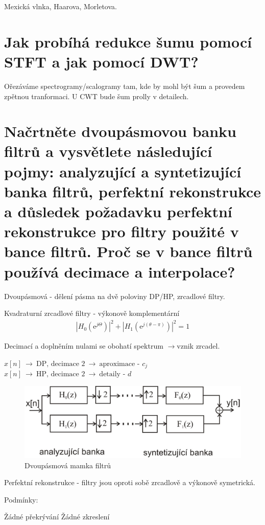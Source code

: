 \documentclass[a4paper,12pt]{article}   %
\newcommand{\rrarr}{$\rightarrow$}
\newcommand{\ejt}{\text{e}^{j\Theta}}
\newcommand{\e}{\text{e}}
\begin{document}
Mexická vlnka, Haarova, Morletova.


\section{Jak probíhá redukce šumu pomocí STFT a jak pomocí DWT?}

Ořezáváme spectrogramy/scalogramy tam, kde by mohl být šum a provedem zpětnou tranformaci. U CWT bude šum prolly v detailech. 


\section{Načrtněte dvoupásmovou banku filtrů a vysvětlete následující pojmy: analyzující a syntetizující banka filtrů, perfektní rekonstrukce a důsledek požadavku perfektní rekonstrukce pro filtry použité v bance filtrů. Proč se v bance filtrů používá decimace a interpolace?}
Dvoupásmová - dělení pásma na dvě poloviny DP/HP, zrcadlové filtry. 

Kvadraturní zrcadlové filtry - výkonově komplementární \
\begin{align*}
        |H_0(\ejt)|^2 + |H_1(\e^{j(\theta-\pi)})|^2 = 1
\end{align*}

Decimací a doplněním nulami se obohatí spektrum \rrarr vznik zrcadel.


$x[n]~\rightarrow~\text{DP, decimace 2}~\rightarrow~\text{aproximace - }c_j$\\
$x[n]~\rightarrow~\text{HP, decimace 2}~\rightarrow~\text{detaily - }d$

\begin{figure}[h!]
        \centering
        \includegraphics[width=.7\textwidth]{fig/banka_filtru.png}
        \caption*{Dvoupásmová mamka filtrů}
\end{figure}

Perfektní rekonstrukce - filtry jsou oproti sobě zrcadlově a výkonově symetrická.

Podmínky:
\begin{outline}
        \1 Žádné překrývání
        \1 Žádné zkreslení
\end{outline}
\end{document}
